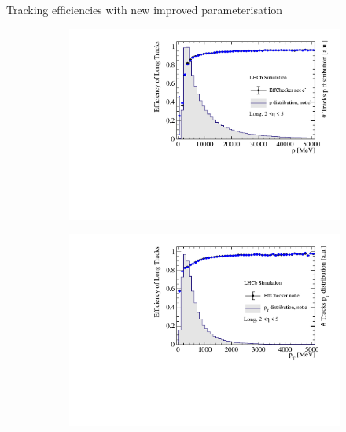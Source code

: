 \documentclass[xcolor={dvipsnames}]{beamer}
\begin{document}
\begin{frame}{Tracking efficiencies with new improved parameterisation}
  \vspace{0.0cm}
  \begin{figure}[htb]
    \centering
    \begin{subfigure}{0.45\textwidth}
      \includegraphics[width=1\textwidth]{Plots/TrackEfficiency_p_official_MC_old_new_parameterisation_comparison.pdf}
    \end{subfigure}%
    \begin{subfigure}{0.45\textwidth}
      \includegraphics[width=1\textwidth]{Plots/TrackEfficiency_pt_official_MC_old_new_parameterisation_comparison.pdf}
    \end{subfigure}
    \begin{subfigure}{0.45\textwidth}

\end{subfigure}
\end{figure}
\end{frame}
\end{document}
